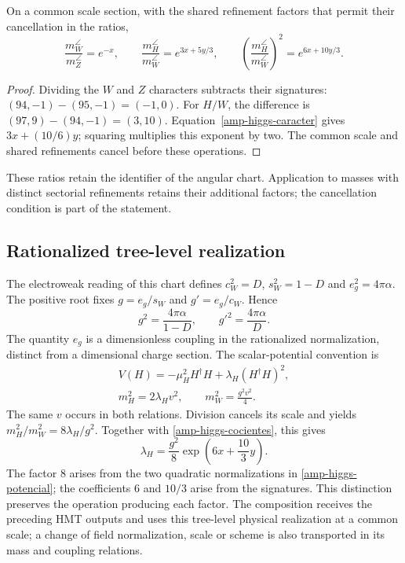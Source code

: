 \begin{proposition}
On a common scale section, with the shared refinement factors that permit
their cancellation in the ratios,
\begin{equation}
 \frac{m_W^{\angle}}{m_Z^{\angle}}=e^{-x},\qquad
 \frac{m_H^{\angle}}{m_W^{\angle}}
 =e^{3x+5y/3},\qquad
 \left(\frac{m_H^{\angle}}{m_W^{\angle}}\right)^2
 =e^{6x+10y/3}.
 \label{amp-higgs-cocientes}
\end{equation}
\end{proposition}
\begin{proof}
Dividing the $W$ and $Z$ characters subtracts their signatures:
$(94,-1)-(95,-1)=(-1,0)$. For $H/W$, the difference is
$(97,9)-(94,-1)=(3,10)$. Equation~\eqref{amp-higgs-caracter} gives
$3x+(10/6)y$; squaring multiplies this exponent by two. The common scale
and shared refinements cancel before these operations.
\end{proof}
These ratios retain the identifier of the angular chart. Application to
masses with distinct sectorial refinements retains their additional factors;
the cancellation condition is part of the statement.

\subsection{Rationalized tree-level realization}

The electroweak reading of this chart defines
$c_W^2=D$, $s_W^2=1-D$ and $e_g^2=4\pi\alpha$. The positive root fixes
$g=e_g/s_W$ and $g'=e_g/c_W$. Hence
\begin{equation}
 g^2=\frac{4\pi\alpha}{1-D},\qquad
 g'^2=\frac{4\pi\alpha}{D}.
 \label{amp-higgs-calibre}
\end{equation}
The quantity $e_g$ is a dimensionless coupling in the rationalized
normalization, distinct from a dimensional charge section.
The scalar-potential convention is
\begin{equation}
 \begin{gathered}
 V(H)=-\mu_H^2H^\dagger H+\lambda_H(H^\dagger H)^2,\\
 m_H^2=2\lambda_Hv^2,\qquad m_W^2=\frac{g^2v^2}{4}.
 \end{gathered}
 \label{amp-higgs-potencial}
\end{equation}
The same $v$ occurs in both relations. Division cancels its scale and yields
$m_H^2/m_W^2=8\lambda_H/g^2$. Together with
\eqref{amp-higgs-cocientes}, this gives
\begin{equation}
 \boxed{\lambda_H=\frac{g^2}{8}\exp\!\left(6x+\frac{10}{3}y\right).}
 \label{amp-higgs-lambda}
\end{equation}
The factor $8$ arises from the two quadratic normalizations in
\eqref{amp-higgs-potencial}; the coefficients $6$ and $10/3$ arise from
the signatures. This distinction preserves the operation producing each
factor. The composition receives the preceding HMT outputs and uses this
tree-level physical realization at a common scale; a change of field
normalization, scale or scheme is also transported in its mass and coupling
relations.

